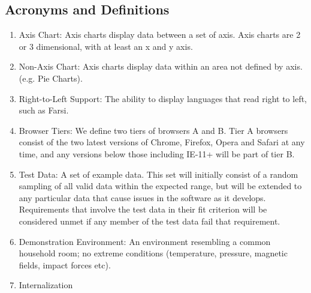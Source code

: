 \documentclass[12pt, titlepage]{article}
\begin{document}
\subsection{Acronyms and Definitions}
\begin{enumerate}
    \item Axis Chart: Axis charts display data between a set of axis. Axis charts are 2 or 3 dimensional, with at least an x and y axis.
    \item Non-Axis Chart: Axis charts display data within an area not defined by axis. (e.g. Pie Charts).
    \item Right-to-Left Support: The ability to display languages that read right to left, such as Farsi.
    \item Browser Tiers: We define two tiers of browsers A and B. Tier A browsers consist of the two latest versions of Chrome, Firefox, Opera and Safari at any time, and any versions below those including IE-11+ will be part of tier B.
    \item Test Data: A set of example data. This set will initially consist of a random sampling of all valid data within the expected range, but will be extended to any particular data that cause issues in the software as it develops. Requirements that involve the test data in their fit criterion will be considered unmet if any member of the test data fail that requirement.
    \item Demonstration Environment: An environment resembling a common household room; no extreme conditions (temperature, pressure, magnetic fields, impact forces etc).
    \item Internalization
\end{enumerate}



\end{document}

